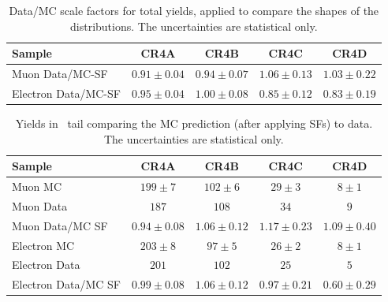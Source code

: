 \begin{table}[!h]
\begin{center}
\begin{tabular}{l||c|c|c|c}
\hline
Sample              & CR4A & CR4B & CR4C & CR4D \\
\hline
\hline
Muon Data/MC-SF 	  & $0.91 \pm 0.04$ & $0.94 \pm 0.07$ & $1.06 \pm 0.13$ & $1.03 \pm 0.22$ \\
\hline
\hline
Electron Data/MC-SF 	  & $0.95 \pm 0.04$ & $1.00 \pm 0.08$ & $0.85 \pm 0.12$ & $0.83 \pm 0.19$ \\
\hline
\end{tabular}
\caption{ Data/MC scale factors for total yields, applied to compare
  the shapes of the distributions.
  The uncertainties are statistical only.
\label{tab:cr4mtsf}}
\end{center}
\end{table}


\begin{table}[!h]
\begin{center}
\begin{tabular}{l||c|c|c|c}
\hline
Sample              & CR4A & CR4B & CR4C & CR4D \\
\hline
\hline
Muon MC 		  & $199 \pm 7$ & $102 \pm 6$ & $29 \pm 3$ & $8 \pm 1$ \\
Muon Data 		  & $187$ & $108$ & $34$ & $9$ \\
\hline
Muon Data/MC SF 	  & $0.94 \pm 0.08$ & $1.06 \pm 0.12$ & $1.17 \pm 0.23$ & $1.09 \pm 0.40$ \\
\hline
\hline
Electron MC 		  & $203 \pm 8$ & $97 \pm 5$ & $26 \pm 2$ & $8 \pm 1$ \\
Electron Data 		  & $201$ & $102$ & $25$ & $5$ \\
\hline
Electron Data/MC SF 	  & $0.99 \pm 0.08$ & $1.06 \pm 0.12$ & $0.97 \pm 0.21$ & $0.60 \pm 0.29$ \\
\hline
\end{tabular}
\caption{ Yields in \mt\ tail comparing the MC prediction (after
  applying SFs) to data. The uncertainties are statistical only.
\label{tab:cr4yields}}
\end{center}
\end{table}

